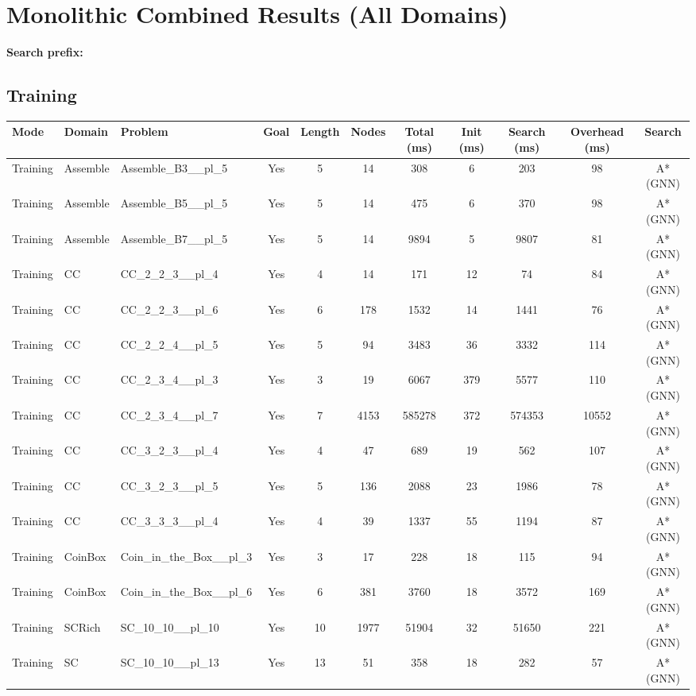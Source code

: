\documentclass{article}
\begin{document}
\section*{Monolithic Combined Results (All Domains)}
\textbf{Search prefix:} 
\\[0.5cm]
\subsection*{Training}
\begin{tabular}{lllcccccccc}
\toprule
Mode & Domain & Problem & Goal & Length & Nodes & Total (ms) & Init (ms) & Search (ms) & Overhead (ms) & Search \\
\midrule
Training & Assemble & Assemble\_B3\_\_pl\_5 & Yes & 5 & 14 & 308 & 6 & 203 & 98 & A*(GNN) \\
Training & Assemble & Assemble\_B5\_\_pl\_5 & Yes & 5 & 14 & 475 & 6 & 370 & 98 & A*(GNN) \\
Training & Assemble & Assemble\_B7\_\_pl\_5 & Yes & 5 & 14 & 9894 & 5 & 9807 & 81 & A*(GNN) \\
Training & CC & CC\_2\_2\_3\_\_pl\_4 & Yes & 4 & 14 & 171 & 12 & 74 & 84 & A*(GNN) \\
Training & CC & CC\_2\_2\_3\_\_pl\_6 & Yes & 6 & 178 & 1532 & 14 & 1441 & 76 & A*(GNN) \\
Training & CC & CC\_2\_2\_4\_\_pl\_5 & Yes & 5 & 94 & 3483 & 36 & 3332 & 114 & A*(GNN) \\
Training & CC & CC\_2\_3\_4\_\_pl\_3 & Yes & 3 & 19 & 6067 & 379 & 5577 & 110 & A*(GNN) \\
Training & CC & CC\_2\_3\_4\_\_pl\_7 & Yes & 7 & 4153 & 585278 & 372 & 574353 & 10552 & A*(GNN) \\
Training & CC & CC\_3\_2\_3\_\_pl\_4 & Yes & 4 & 47 & 689 & 19 & 562 & 107 & A*(GNN) \\
Training & CC & CC\_3\_2\_3\_\_pl\_5 & Yes & 5 & 136 & 2088 & 23 & 1986 & 78 & A*(GNN) \\
Training & CC & CC\_3\_3\_3\_\_pl\_4 & Yes & 4 & 39 & 1337 & 55 & 1194 & 87 & A*(GNN) \\
Training & CoinBox & Coin\_in\_the\_Box\_\_pl\_3 & Yes & 3 & 17 & 228 & 18 & 115 & 94 & A*(GNN) \\
Training & CoinBox & Coin\_in\_the\_Box\_\_pl\_6 & Yes & 6 & 381 & 3760 & 18 & 3572 & 169 & A*(GNN) \\
Training & SCRich & SC\_10\_10\_\_pl\_10 & Yes & 10 & 1977 & 51904 & 32 & 51650 & 221 & A*(GNN) \\
Training & SC & SC\_10\_10\_\_pl\_13 & Yes & 13 & 51 & 358 & 18 & 282 & 57 & A*(GNN) \\

\end{tabular}
\end{document}
